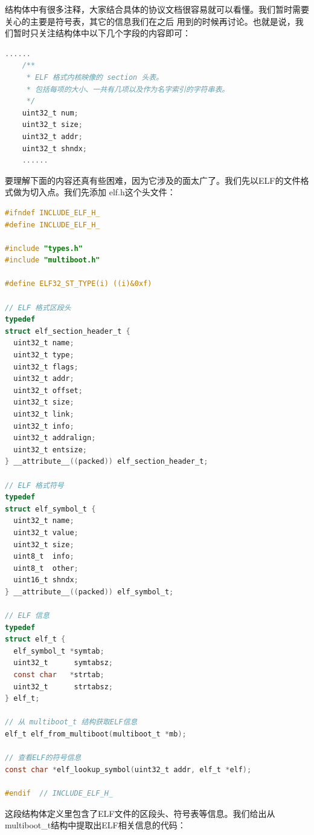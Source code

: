 \par 结构体中有很多注释，大家结合具体的协议文档很容易就可以看懂。我们暂时需要关心的主要是符号表，其它的信息我们在之后\allowbreak
用到的时候再讨论。也就是说，我们暂时只关注结构体中以下几个字段的内容即可：

\begin{lstlisting}[language = C, caption = include/multiboot.h]
	......
	/**
	 * ELF 格式内核映像的 section 头表。
	 * 包括每项的大小、一共有几项以及作为名字索引的字符串表。
	 */
	uint32_t num;
	uint32_t size;
	uint32_t addr;
	uint32_t shndx;
	......
\end{lstlisting}

要理解下面的内容还真有些困难，因为它涉及的面太广了。我们先以ELF的文件格式做为切入点。我们先添加\allowbreak
elf.h这个头文件：

\begin{lstlisting}[language = C, caption = include/elf.h]
#ifndef INCLUDE_ELF_H_
#define INCLUDE_ELF_H_

#include "types.h"
#include "multiboot.h"

#define ELF32_ST_TYPE(i) ((i)&0xf)

// ELF 格式区段头
typedef
struct elf_section_header_t {
  uint32_t name;
  uint32_t type;
  uint32_t flags;
  uint32_t addr;
  uint32_t offset;
  uint32_t size;
  uint32_t link;
  uint32_t info;
  uint32_t addralign;
  uint32_t entsize;
} __attribute__((packed)) elf_section_header_t;

// ELF 格式符号
typedef
struct elf_symbol_t {
  uint32_t name;
  uint32_t value;
  uint32_t size;
  uint8_t  info;
  uint8_t  other;
  uint16_t shndx;
} __attribute__((packed)) elf_symbol_t;

// ELF 信息
typedef
struct elf_t {
  elf_symbol_t *symtab;
  uint32_t      symtabsz;
  const char   *strtab;
  uint32_t      strtabsz;
} elf_t;

// 从 multiboot_t 结构获取ELF信息
elf_t elf_from_multiboot(multiboot_t *mb);

// 查看ELF的符号信息
const char *elf_lookup_symbol(uint32_t addr, elf_t *elf);

#endif 	// INCLUDE_ELF_H_
\end{lstlisting}

\par 这段结构体定义里包含了ELF文件的区段头、符号表等信息。我们给出从multiboot\_t结构中提取出ELF相关信息的代码：

